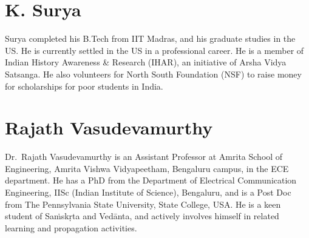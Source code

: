 \section*{K. Surya}

Surya completed his B.Tech from IIT Madras, and his graduate studies in the US. He is currently settled in the US in a professional career. He is a member of Indian History Awareness \& Research (IHAR), an initiative of Arsha Vidya Satsanga. He also volunteers for North South Foundation (NSF) to raise money for scholarships for poor students in India. 

\section*{Rajath Vasudevamurthy}

Dr.~Rajath Vasudevamurthy is an Assistant Professor at Amrita School of Engineering, Amrita Vishwa Vidyapeetham, Bengaluru campus, in the ECE department. He has a PhD from the Department of Electrical Communication Engineering, IISc (Indian Institute of Science), Bengaluru, and is a Post Doc from The Pennsylvania State University, State College, USA. He is a keen student of Saṁskṛta and Vedānta, and actively involves himself in related learning and propagation activities.


